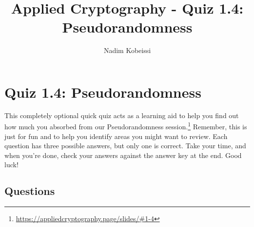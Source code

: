 \documentclass[10pt,a4paper,american]{exam}
\title{Applied Cryptography - Quiz 1.4: Pseudorandomness}
\author{Nadim Kobeissi}
\begin{document}
\classhandoutheader
\section*{Quiz 1.4: Pseudorandomness}

\begin{tcolorbox}[colframe=OliveGreen!30!white,colback=OliveGreen!5!white]
	This completely optional quick quiz acts as a learning aid to help you find out how much you absorbed from our Pseudorandomness session.\footnote{\url{https://appliedcryptography.page/slides/\#1-4}} Remember, this is just for fun and to help you identify areas you might want to review. Each question has three possible answers, but only one is correct. Take your time, and when you're done, check your answers against the answer key at the end. Good luck!
\end{tcolorbox}

\subsection*{Questions}
\end{document}
